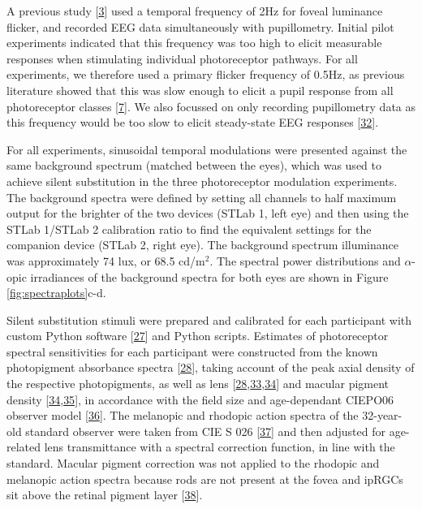 \documentclass[
]{article}
\begin{document}
A previous study {[}\protect\hyperlink{ref-Segala2023}{3}{]} used a temporal frequency of 2Hz for foveal luminance flicker, and recorded EEG data simultaneously with pupillometry. Initial pilot experiments indicated that this frequency was too high to elicit measurable responses when stimulating individual photoreceptor pathways. For all experiments, we therefore used a primary flicker frequency of 0.5Hz, as previous literature showed that this was slow enough to elicit a pupil response from all photoreceptor classes {[}\protect\hyperlink{ref-Spitschan2014}{7}{]}. We also focussed on only recording pupillometry data as this frequency would be too slow to elicit steady-state EEG responses {[}\protect\hyperlink{ref-Norcia2015}{32}{]}.

For all experiments, sinusoidal temporal modulations were presented against the same background spectrum (matched between the eyes), which was used to achieve silent substitution in the three photoreceptor modulation experiments. The background spectra were defined by setting all channels to half maximum output for the brighter of the two devices (STLab 1, left eye) and then using the STLab 1/STLab 2 calibration ratio to find the equivalent settings for the companion device (STLab 2, right eye). The background spectrum illuminance was approximately 74 lux, or 68.5 cd/m\(^2\). The spectral power distributions and \(\alpha\)-opic irradiances of the background spectra for both eyes are shown in Figure \ref{fig:spectraplots}c-d.

Silent substitution stimuli were prepared and calibrated for each participant with custom Python software {[}\protect\hyperlink{ref-Martin2023}{27}{]} and Python scripts. Estimates of photoreceptor spectral sensitivities for each participant were constructed from the known photopigment absorbance spectra {[}\protect\hyperlink{ref-Stockman2000}{28}{]}, taking account of the peak axial density of the respective photopigments, as well as lens {[}\protect\hyperlink{ref-Stockman2000}{28},\protect\hyperlink{ref-Pokorny1987}{33},\protect\hyperlink{ref-Stockman1999}{34}{]} and macular pigment density {[}\protect\hyperlink{ref-Stockman1999}{34},\protect\hyperlink{ref-Bone1988}{35}{]}, in accordance with the field size and age-dependant CIEPO06 observer model {[}\protect\hyperlink{ref-CIE2006}{36}{]}. The melanopic and rhodopic action spectra of the 32-year-old standard observer were taken from CIE S 026 {[}\protect\hyperlink{ref-CIE2018}{37}{]} and then adjusted for age-related lens transmittance with a spectral correction function, in line with the standard. Macular pigment correction was not applied to the rhodopic and melanopic action spectra because rods are not present at the fovea and ipRGCs sit above the retinal pigment layer {[}\protect\hyperlink{ref-Trieschmann2007}{38}{]}.
\end{document}
